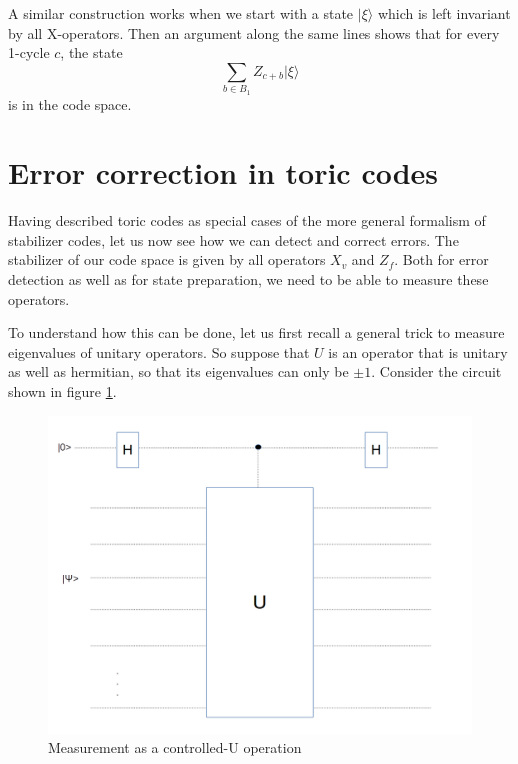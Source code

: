 \documentclass[a4paper, draft]{article}
\theoremstyle{own}
\theoremstyle{remark}
\begin{document}
A similar construction works when we start with a state $|\xi \rangle$ which is left invariant by all X-operators. Then an argument along the same lines shows that for every 1-cycle $c$, the state
$$
\sum_{b \in B_1} Z_{c + b} |\xi \rangle
$$
is in the code space. 


\section{Error correction in toric codes}

Having described toric codes as special cases of the more general formalism of stabilizer codes, let us now see how we can detect and correct errors. The stabilizer of our code space is given by all operators $X_v$ and $Z_f$. Both for error detection as well as for state preparation, we need to be able to measure these operators. 

To understand how this can be done, let us first recall a general trick to measure eigenvalues of unitary operators. So suppose that $U$ is an operator that is unitary as well as hermitian, so that its eigenvalues can only be $\pm 1$. Consider the circuit shown in figure \ref{fig:ControlledUMeasurement}.

\begin{figure}[ht]
\centering
\includegraphics[width=0.7\linewidth]{images/ControlledUMeasurement}
\caption[Measurement as a controlled-U operation]{Measurement as a controlled-U operation}
\label{fig:ControlledUMeasurement}
\end{figure}
\end{document}
